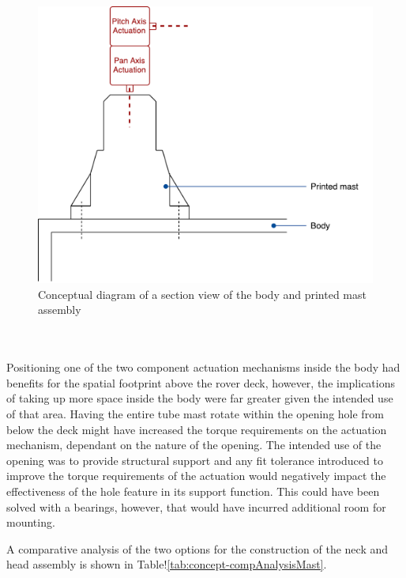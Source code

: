 \begin{itemize}
        \begin{figure}[H]
          \centering
          \includegraphics[width=0.7\linewidth]{figures/concepts-printedMast}
          \caption[Conceptual diagram of a section view of the body and printed mast assembly]{Conceptual diagram of a section view of the body and printed mast assembly}
          \label{fig:concepts-printedMast}
        \end{figure}
        
      \end{itemize}
      
      \\\\
        Positioning one of the two component actuation mechanisms inside the body had benefits for the spatial footprint above the rover deck, however, the implications of taking up more space inside the body were far greater given the intended use of that area. Having the entire tube mast rotate within the opening hole from below the deck might have increased the torque requirements on the actuation mechanism, dependant on the nature of the opening. The intended use of the opening was to provide structural support and any fit tolerance introduced to improve the torque requirements of the actuation would negatively impact the effectiveness of the hole feature in its support function. This could have been solved with a bearings, however, that would have incurred additional room for mounting.
      
      A comparative analysis of the two options for the construction of the neck and head assembly is shown in Table!\ref{tab:concept-compAnalysisMast}.
      
